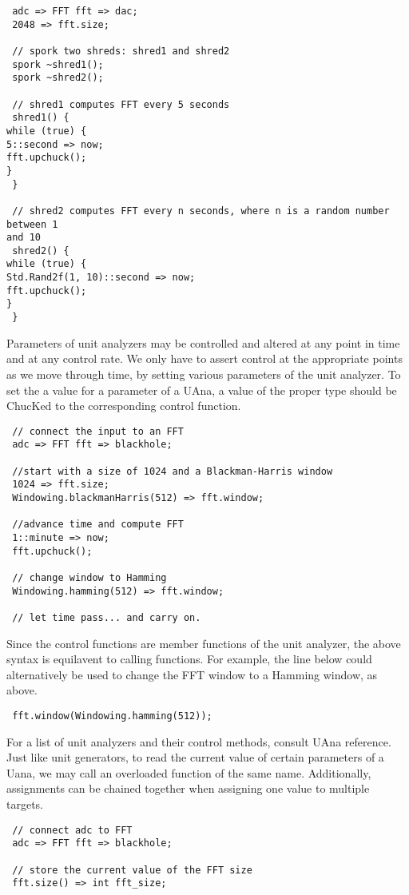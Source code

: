 \begin{verbatim}
 adc => FFT fft => dac;
 2048 => fft.size;

 // spork two shreds: shred1 and shred2
 spork ~shred1();
 spork ~shred2();

 // shred1 computes FFT every 5 seconds
 shred1() {
while (true) {
5::second => now;
fft.upchuck();
}
 }

 // shred2 computes FFT every n seconds, where n is a random number between 1
and 10
 shred2() {
while (true) {
Std.Rand2f(1, 10)::second => now;
fft.upchuck();
}
 }
\end{verbatim}

Parameters of unit analyzers may be controlled and altered at any point in time
and at any control rate. We only have to assert control at the appropriate
points as we move through time, by setting various parameters of the unit
analyzer. To set the a value for a parameter of a UAna, a value of the proper
type should be ChucKed to the corresponding control function.

\begin{verbatim}
 // connect the input to an FFT
 adc => FFT fft => blackhole;

 //start with a size of 1024 and a Blackman-Harris window
 1024 => fft.size;
 Windowing.blackmanHarris(512) => fft.window;

 //advance time and compute FFT
 1::minute => now;
 fft.upchuck();

 // change window to Hamming
 Windowing.hamming(512) => fft.window;

 // let time pass... and carry on.
\end{verbatim}

Since the control functions are member functions of the unit analyzer, the
above syntax is equilavent to calling functions. For example, the line below
could alternatively be used to change the FFT window to a Hamming window, as
above.

\begin{verbatim}
 fft.window(Windowing.hamming(512));
\end{verbatim}

For a list of unit analyzers and their control methods, consult UAna reference.
Just like unit generators, to read the current value of certain parameters of a
Uana, we may call an overloaded function of the same name. Additionally,
assignments can be chained together when assigning one value to multiple
targets.

\begin{verbatim}
 // connect adc to FFT
 adc => FFT fft => blackhole;

 // store the current value of the FFT size
 fft.size() => int fft_size;
\end{verbatim}

